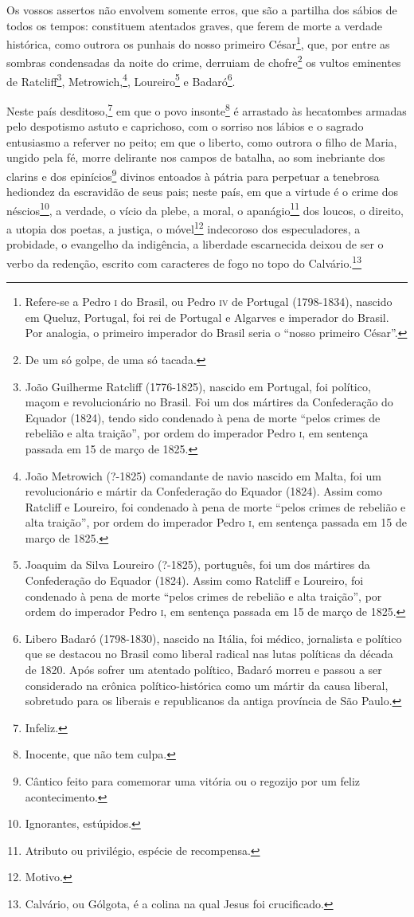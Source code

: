 Os vossos assertos não envolvem somente erros, que são a partilha dos
sábios de todos os tempos: constituem atentados graves, que ferem de
morte a verdade histórica, como outrora os punhais do nosso primeiro
César\footnote{Refere-se a Pedro \textsc{i} do Brasil, ou Pedro \textsc{iv} de Portugal
  (1798-1834), nascido em Queluz, Portugal, foi rei de Portugal e
  Algarves e imperador do Brasil. Por analogia, o primeiro imperador do
  Brasil seria o ``nosso primeiro César''.}, que, por entre as sombras
condensadas da noite do crime, derruiam de chofre\footnote{De um só
  golpe, de uma só tacada.} os vultos eminentes de Ratcliff\footnote{
  João Guilherme Ratcliff (1776-1825), nascido em Portugal, foi
  político, maçom e revolucionário no Brasil. Foi um dos mártires da
  Confederação do Equador (1824), tendo sido condenado à pena de morte
  ``pelos crimes de rebelião e alta traição'', por ordem do imperador
  Pedro \textsc{i}, em sentença passada em 15 de março de 1825.\label{ratcliff}},
Metrowich,\footnote{João Metrowich (?-1825) comandante de navio
  nascido em Malta, foi um revolucionário e mártir da Confederação do
  Equador (1824). Assim como Ratcliff e Loureiro, foi condenado à pena
  de morte ``pelos crimes de rebelião e alta traição'', por ordem do
  imperador Pedro \textsc{i}, em sentença passada em 15 de março de 1825.},
Loureiro\footnote{Joaquim da Silva Loureiro (?-1825), português, foi
  um dos mártires da Confederação do Equador (1824). Assim como Ratcliff
  e Loureiro, foi condenado à pena de morte ``pelos crimes de rebelião e
  alta traição'', por ordem do imperador Pedro \textsc{i}, em sentença passada em
  15 de março de 1825.} e Badaró\footnote{Libero Badaró (1798-1830),
  nascido na Itália, foi médico, jornalista e político que se destacou
  no Brasil como liberal radical nas lutas políticas da década de 1820.
  Após sofrer um atentado político, Badaró morreu e passou a ser
  considerado na crônica político-histórica como um mártir da causa
  liberal, sobretudo para os liberais e republicanos da antiga província
  de São Paulo.}.

Neste país desditoso,\footnote{Infeliz.} em que o povo
insonte\footnote{Inocente, que não tem culpa.} é arrastado às
hecatombes armadas pelo despotismo astuto e caprichoso, com o sorriso
nos lábios e o sagrado entusiasmo a referver no peito; em que o liberto,
como outrora o filho de Maria, ungido pela fé, morre delirante nos
campos de batalha, ao som inebriante dos clarins e dos
epinícios\footnote{Cântico feito para comemorar uma vitória ou o
  regozijo por um feliz acontecimento.} divinos entoados à pátria para
perpetuar a tenebrosa hediondez da escravidão de seus pais; neste país,
em que a virtude é o crime dos néscios\footnote{Ignorantes, estúpidos.},
a verdade, o vício da plebe, a moral, o apanágio\footnote{Atributo ou
  privilégio, espécie de recompensa.} dos loucos, o direito, a utopia
dos poetas, a justiça, o móvel\footnote{Motivo.} indecoroso dos
especuladores, a probidade, o evangelho da indigência, a liberdade
escarnecida deixou de ser o verbo da redenção, escrito com caracteres de
fogo no topo do Calvário.\footnote{Calvário, ou Gólgota, é a colina na
  qual Jesus foi crucificado.\label{calvario}}


